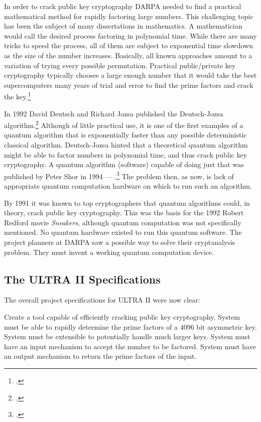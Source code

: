 In order to crack public key cryptography DARPA needed to find a practical mathematical method for rapidly factoring large numbers.  This challenging topic has been the subject of many dissertations in mathematics.  A mathematician would call the desired process factoring in polynomial time.  While there are many tricks to speed the process, all of them are subject to exponential time slowdown as the size of the number increases.  Basically, all known approaches amount to a variation of trying every possible permutation.  Practical public/private key cryptography typically chooses a large enough number that it would take the best supercomputers many years of trial and error to find the prime factors and crack the key.\footcite{ferguson2010}

In 1992 David Deutsch and Richard Jozsa published the Deutsch-Jozsa algorithm.\footcite{deutschjozsa1992}  Although of little practical use, it is one of the first examples of a quantum algorithm that is exponentially faster than any possible deterministic classical algorithm.  Deutsch-Jozsa hinted that a theoretical quantum algorithm might be able to factor numbers in polynomial time, and thus crack public key cryptography.  A quantum algorithm (software) capable of doing just that was published by Peter Shor in 1994 --- .\footcite{shor1994}   The problem then, as now, is lack of appropriate quantum computation hardware on which to run such an algorithm.

By 1991 it was known to top cryptographers that quantum algorithms could, in theory, crack public key cryptography.  This was the basis for the 1992 Robert Redford movie \textit{Sneakers}, although quantum computation was not specifically mentioned.  No quantum hardware existed to run this quantum software.  The project planners at DARPA saw a possible way to solve their cryptanalysis problem.  They must invent a working quantum computation device.

\subsection*{The ULTRA II Specifications}
\label{pos09:the-ultra-ii-specifications}

The overall project specifications for ULTRA II were now clear:

Create a tool capable of efficiently cracking public key cryptography.   System must be able to rapidly determine the prime factors of a 4096 bit asymmetric key.  System must be extensible to potentially handle much larger keys.  System must have an input mechanism to accept the number to be factored.  System must have an output mechanism to return the prime factors of the input.

